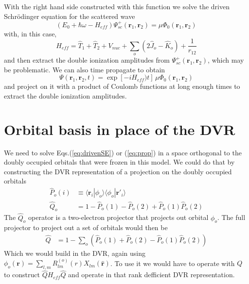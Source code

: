 \documentclass[%
pra%
,twocolumn%
,amssymb, nobibnotes, aps,
longbibliography
]{revtex4-1}
\begin{document}
With the right hand side constructed with this function we solve the driven Schr\"odinger equation for the scattered wave
\begin{equation}
(E_0+\hbar \omega -H_{eff})\Psi_{sc}^+(\mathbf{r}_1,\mathbf{r}_2) = \mu \Phi_0(\mathbf{r}_1,\mathbf{r}_2)
\label{eq:drivenSE}
\end{equation}
with, in this case,
\begin{equation}
H_{eff} = \hat{T}_1 + \hat{T}_2 + V_{nuc} + \sum_o \left( 2 \hat{J}_o - \hat{K}_o \right) + \frac{1}{r_{12}} 
\end{equation}
and then extract the double ionization amplitudes from $\Psi_{sc}^+(\mathbf{r}_1,\mathbf{r}_2) $, which may be problematic. 
We can also time propagate to obtain 
\begin{equation}
\Psi(\mathbf{r}_1,\mathbf{r}_2,t) = \exp[-iH_{eff})t]\,\mu \Phi_0(\mathbf{r}_1,\mathbf{r}_2)
\label{eq:prop}
\end{equation}
 and project on it with a product of Coulomb functions at long enough times to extract the double ionization amplitudes.                                                                                                                  

\section{Orbital basis in place of the DVR}
\label{sec:orbbasis}
We need to solve Eqs.(\ref{eq:drivenSE}) or (\ref{eq:prop})  in a space orthogonal to the doubly occupied orbitals that were frozen in this model.  We could do that by constructing the DVR representation of a projection on the doubly occupied orbitals
\begin{equation}
\begin{split}
\hat{P}_o(i) & \equiv  \langle \mathbf{r}_i | \phi_o \rangle \langle \phi_o|\mathbf{r'}_i \rangle \\
\hat{Q}_o &= 1 - \hat{P}_o(1) -  \hat{P}_o(2 ) + \hat{P}_o(1)\hat{P}_o(2)
\end{split}
\end{equation}
The $\hat{Q}_o$ operator is a two-electron projector that projects out orbital $\phi_o$. The full projector to project out a set of orbitals would then be
\begin{equation}
\begin{split}
\hat{Q}&= 1 - \sum_o (  \hat{P}_o(1) +  \hat{P}_o(2 ) - \hat{P}_o(1)\hat{P}_o(2))
\end{split}
\end{equation}
Which we would build in the DVR, again using $\phi_o(\mathbf{r}) = \sum_{l,m} R^{(o)}_{lm}(r) X_{lm} (  \mathbf{\hat{r}} )$.  To use it we would have to operate with $Q$ to construct $\hat{Q} H_{eff} \hat{Q}$ and operate in that rank defficient DVR representation. 
\end{document}
